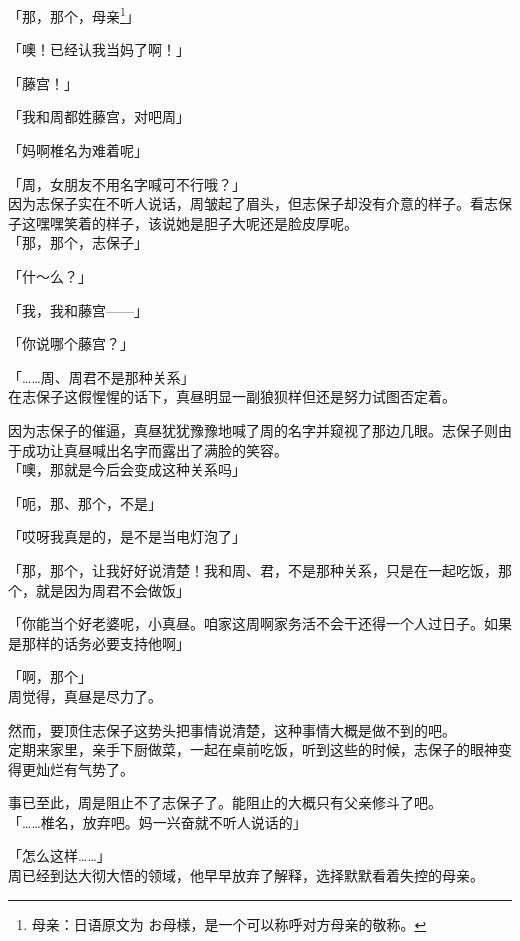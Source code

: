 「那，那个，母亲\footnote{母亲：日语原文为 {\jpfont お母様}，是一个可以称呼对方母亲的敬称。}」

「噢！已经认我当妈了啊！」

「藤宫！」

「我和周都姓藤宫，对吧周」

「妈啊椎名为难着呢」

「周，女朋友不用名字喊可不行哦？」\\

因为志保子实在不听人说话，周皱起了眉头，但志保子却没有介意的样子。看志保子这嘿嘿笑着的样子，该说她是胆子大呢还是脸皮厚呢。\\

「那，那个，志保子」

「什～么？」

「我，我和藤宫——」

「你说哪个藤宫？」

「……周、周君不是那种关系」\\

在志保子这假惺惺的话下，真昼明显一副狼狈样但还是努力试图否定着。

因为志保子的催逼，真昼犹犹豫豫地喊了周的名字并窥视了那边几眼。志保子则由于成功让真昼喊出名字而露出了满脸的笑容。\\

「噢，那就是今后会变成这种关系吗」

「呃，那、那个，不是」

「哎呀我真是的，是不是当电灯泡了」

「那，那个，让我好好说清楚！我和周、君，不是那种关系，只是在一起吃饭，那个，就是因为周君不会做饭」

「你能当个好老婆呢，小真昼。咱家这周啊家务活不会干还得一个人过日子。如果是那样的话务必要支持他啊」

「啊，那个」\\

周觉得，真昼是尽力了。

然而，要顶住志保子这势头把事情说清楚，这种事情大概是做不到的吧。\\

定期来家里，亲手下厨做菜，一起在桌前吃饭，听到这些的时候，志保子的眼神变得更灿烂有气势了。

事已至此，周是阻止不了志保子了。能阻止的大概只有父亲修斗了吧。\\

「……椎名，放弃吧。妈一兴奋就不听人说话的」

「怎么这样……」\\

周已经到达大彻大悟的领域，他早早放弃了解释，选择默默看着失控的母亲。
